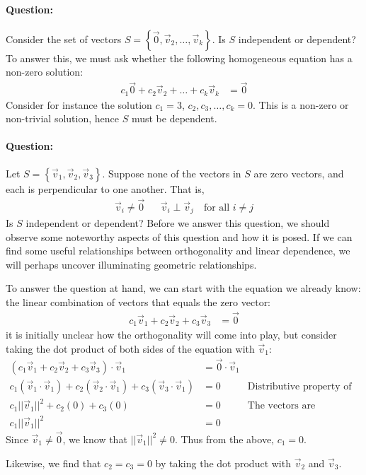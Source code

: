 \documentclass[11pt]{article}
\newcommand{\ques}{\paragraph{Question:}}
\newcommand{\vek}[1]{\vec{#1}}
\begin{document}
\ques Consider the set of vectors $S = \left\{ \vek{0}, \vek{v}_2, \dots, \vek{v}_k \right\}$. Is $S$ independent or dependent? To answer this, we must ask whether the following homogeneous equation has a non-zero solution:
\begin{align*}
c_1 \vek{0} + c_2 \vek{v}_2 + \dots + c_k \vek{v}_k &= \vek{0}
\end{align*}
Consider for instance the solution $c_1 = 3$, $c_2,c_3,\dots,c_k = 0$. This is a non-zero or non-trivial solution, hence $S$ must be dependent.

\ques Let $S = \left\{ \vek{v}_1, \vek{v}_2, \vek{v}_3 \right\}$.
Suppose none of the vectors in $S$ are zero vectors, and each is perpendicular to one another. That is,
\begin{align*}
\vek{v}_i \neq \vek{0}
&&
\vek{v}_i \perp \vek{v}_j \quad \text{for all $i \neq j$}
\end{align*}
Is $S$ independent or dependent? Before we answer this question, we should observe some noteworthy aspects of this question and how it is posed. If we can find some useful relationships between orthogonality and linear dependence, we will perhaps uncover illuminating geometric relationships.

To answer the question at hand, we can start with the equation we already know: the linear combination of vectors that equals the zero vector:
\begin{align*}
c_1 \vek{v}_1 + c_2 \vek{v}_2 + c_3 \vek{v}_3 &= \vek{0}
\end{align*}
it is initially unclear how the orthogonality will come into play, but consider taking the dot product of both sides of the equation with $\vek{v}_1$:
\begin{align*}
\left( c_1 \vek{v}_1 + c_2 \vek{v}_2 + c_3 \vek{v}_3 \right) \cdot \vek{v}_1 &= \vek{0} \cdot \vek{v}_1
\\
c_1 \left( \vek{v}_1 \cdot \vek{v}_1 \right) +
c_2 \left( \vek{v}_2 \cdot \vek{v}_1 \right) +
c_3 \left( \vek{v}_3 \cdot \vek{v}_1 \right) &= 0 & \text{Distributive property of dot product}
\\
c_1 || \vek{v}_1 ||^2 + c_2(0) + c_3(0) &= 0 & \text{The vectors are orthogonal to each other}
\\
c_1 || \vek{v}_1 ||^2 &= 0
\end{align*}
Since $\vek{v}_1 \neq \vek{0}$, we know that $|| \vek{v}_1 ||^2 \neq 0$. Thus from the above, $c_1 = 0$.

Likewise, we find that $c_2 = c_3 = 0$ by taking the dot product with $\vek{v}_2$ and $\vek{v}_3$.
\end{document}
